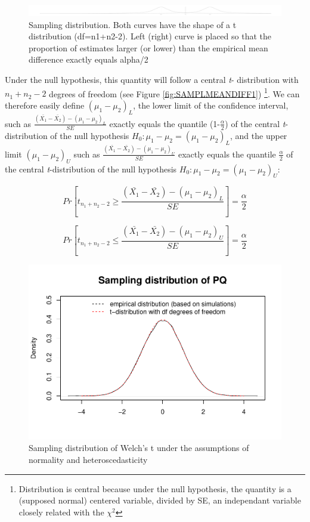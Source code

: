 \documentclass[
  man,floatsintext]{apa6}
\begin{document}
\begin{figure}
\centering
\includegraphics{Appendix2_files/figure-latex/ILLUSTRATION-1.pdf}
\caption{\label{fig:ILLUSTRATION}Sampling distribution. Both curves have the shape of a t distribution (df=n1+n2-2). Left (right) curve is placed so that the proportion of estimates larger (or lower) than the empirical mean difference exactly equals alpha/2}
\end{figure}

Under the null hypothesis, this quantity will follow a central \emph{t}- distribution with \(n_1+n_2-2\) degrees of freedom (see Figure \ref{fig:SAMPLMEANDIFF1}) \footnote{Distribution is central because under the null hypothesis, the quantity is a (supposed normal) centered variable, divided by SE, an independant variable closely related with the $\chi^2$}. We can therefore easily define \((\mu_1-\mu_2)_L\), the lower limit of the confidence interval, such as \(\frac{(\bar{X_1}-\bar{X_2})-(\mu_1-\mu_2)_L}{SE}\) exactly equals the quantile (1-\(\frac{\alpha}{2}\)) of the central \emph{t}-distribution of the null hypothesis \(H_0: \mu_1 - \mu_2 = (\mu_1-\mu_2)_L\), and the upper limit \((\mu_1-\mu_2)_U\) such as \(\frac{(\bar{X_1}-\bar{X_2})-(\mu_1-\mu_2)_U}{SE}\) exactly equals the quantile \(\frac{\alpha}{2}\) of the central \emph{t}-distribution of the null hypothesis \(H_0: \mu_1 - \mu_2 = (\mu_1-\mu_2)_U\):

\begin{equation} 
Pr[t_{n_1+n_2-2} \geq \frac{(\bar{X_1}-\bar{X_2})-(\mu_1-\mu_2)_L}{SE}]= \frac{\alpha}{2}
\label{eq:plausiblelimit1}
\end{equation}

\begin{equation} 
Pr[t_{n_1+n_2-2} \leq \frac{(\bar{X_1}-\bar{X_2})-(\mu_1-\mu_2)_U}{SE}]= \frac{\alpha}{2}
\label{eq:plausiblelimit2}
\end{equation}

\begin{figure}
\centering
\includegraphics{Appendix2_files/figure-latex/SAMPLMEANDIFF2-1.pdf}
\caption{\label{fig:SAMPLMEANDIFF2}Sampling distribution of Welch's t under the assumptions of normality and heteroscedasticity}
\end{figure}
\end{document}
